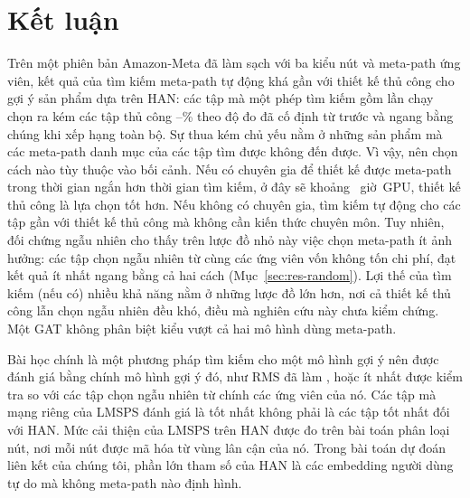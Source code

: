 \section{Kết luận}
\label{sec:conclusion}

Trên một phiên bản Amazon-Meta đã làm sạch với ba kiểu nút và  meta-path ứng
viên, kết quả của tìm kiếm meta-path tự động khá gần với thiết kế thủ công cho gợi ý sản phẩm dựa
trên HAN: các tập mà một phép tìm kiếm gồm  lần chạy chọn ra kém các tập thủ
công --\% theo độ đo đã cố định từ trước và ngang bằng
chúng khi xếp hạng toàn bộ. Sự thua kém chủ yếu nằm ở những sản phẩm mà các meta-path danh mục của
các tập tìm được không đến được. Vì vậy, nên chọn cách nào tùy thuộc vào bối cảnh. Nếu có chuyên
gia để thiết kế được meta-path trong thời gian ngắn hơn thời gian tìm kiếm, ở đây sẽ khoảng
~giờ~GPU, thiết kế thủ công là lựa chọn tốt hơn. Nếu không có chuyên gia,
tìm kiếm tự động cho các tập gần với thiết kế thủ công mà không cần kiến thức chuyên môn. Tuy
nhiên, đối chứng ngẫu nhiên cho thấy trên lược đồ nhỏ này việc chọn meta-path ít ảnh hưởng: các
tập chọn ngẫu nhiên từ cùng các ứng viên vốn không tốn chi phí, đạt kết quả ít nhất ngang bằng
cả hai cách (Mục~\ref{sec:res-random}). Lợi thế của tìm kiếm (nếu có) nhiều khả năng nằm ở những
lược đồ lớn hơn, nơi cả thiết kế thủ công lẫn chọn ngẫu nhiên đều khó, điều mà nghiên cứu này chưa
kiểm chứng. Một GAT không phân biệt kiểu vượt cả hai mô hình dùng meta-path.

Bài học chính là một phương pháp tìm kiếm cho một mô hình gợi ý nên được đánh giá bằng chính mô hình
gợi ý đó, như RMS đã làm \citep{ning2022automatic}, hoặc ít nhất được kiểm tra so với các tập chọn
ngẫu nhiên từ chính các ứng viên của nó. Các tập mà mạng riêng của LMSPS đánh giá là tốt nhất không
phải là các tập tốt nhất đối với HAN. Mức cải thiện của LMSPS trên HAN
\citep[Bảng~4]{li2024longrange} được đo trên bài toán phân loại nút, nơi mỗi nút được mã hóa từ vùng
lân cận của nó. Trong bài toán dự đoán liên kết của chúng tôi, phần lớn tham số của HAN là các
embedding người dùng tự do mà không meta-path nào định hình.

